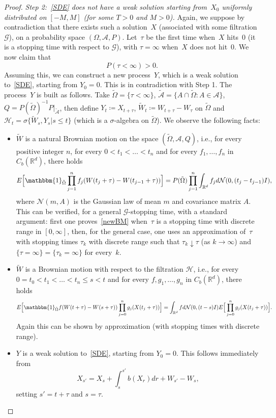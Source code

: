 \documentclass[a4paper,10pt]{article}
\newcommand\1{\mathbbm{1}}
\newcommand{\mr}{\mathbb{R}}
\newcommand{\mc}{\mathcal}
\newcommand{\td}{\tilde}
\numberwithin{equation}{section}
\begin{document}
\begin{proof}
\emph{Step 2:~\eqref{SDE} does not have a weak solution starting from~$X_0$ uniformly distributed on $[-M,M]$ \textup{(}for some $T>0$ and $M>0$\textup{)}.} Again, we suppose by contradiction that there exists such a solution~$X$ (associated with some filtration $\mc{G}$), on a probability space $(\Omega,\mc{A},P)$. Let~$\tau$ be the first time when~$X$ hits~$0$ (it is a stopping time with respect to $\mc{G}$), with $\tau=\infty$ when~$X$ does not hit~$0$. We now claim that
\begin{equation}
P(\tau<\infty)>0 .\label{claim'}
\end{equation}
Assuming this, we can construct a new process~$Y$, which is a weak solution to~\eqref{SDE}, starting from $Y_0=0$. This is in contradiction with Step 1. The process~$Y$ is built as follows. Take $\td{\Omega}=\{\tau<\infty\}$, $\td{\mc{A}}=\{A\cap\td{\Omega} \colon A\in\mc{A}\}$, $Q= P(\td{\Omega})^{-1} P|_{\td{\mc{A}}}$, then define $Y_t \coloneqq X_{t+\tau}$, $\td{W}_t \coloneqq W_{t+\tau}-W_\tau$ on $\td{\Omega}$ and $\mc{H}_t=\sigma\{\td{W}_s,Y_s|s\le t\}$ (which is a $\sigma$-algebra on $\td{\Omega}$). We observe the following facts:

\begin{itemize}
  \item $\td{W}$ is a natural Brownian motion on the space $(\td{\Omega},\mc{A},Q)$, i.e., for every positive integer $n$, for every $0<t_1<\ldots < t_n$ and for every $f_1,\ldots, f_n$ in $C_b(\mr^d)$, there holds 
  \begin{equation}
  E\Big[ \1_{\td{\Omega}}\prod^n_{j=1}f_j(W(t_j+\tau)-W(t_{j-1}+\tau))\Big]= P(\td{\Omega})\prod^n_{j=1}\int_{\mr^d}f_jd\mc{N}(0,(t_j-t_{j-1})I),\label{newBM}
  \end{equation}
  where $\mc{N}(m,A)$ is the Gaussian law of mean $m$ and covariance matrix $A$. This can be verified, for a general $\mc{G}$-stopping time, with a standard argument: first one proves~\eqref{newBM} when~$\tau$ is a stopping time with discrete range in $[0,\infty]$, then, for the general case, one uses an approximation of~$\tau$ with stopping times $\tau_k$ with discrete range such that $\tau_k\downarrow\tau$ (as $k\rightarrow\infty$) and $\{\tau=\infty\}=\{\tau_k=\infty\}$ for every~$k$.
  \item $\td{W}$ is a Brownian motion with respect to the filtration $\mc{H}$, i.e., for every $0=t_0<t_1<\ldots < t_n\le s<t$ and for every $f,g_1,\ldots, g_n$ in $C_b(\mr^d)$, there holds 
  \begin{equation*}
  E\Big[ \1_{\td{\Omega}}f(W(t+\tau)-W(s+\tau))\prod^n_{j=0}g_j(X(t_j+\tau))\Big]= \int_{\mr^d}fd\mc{N}(0,(t-s)I)E\Big[\prod^n_{j=0}g_j(X(t_j+\tau))\Big].
  \end{equation*}
  Again this can be shown by approximation (with stopping times with discrete range).
  \item $Y$ is a weak solution to~\eqref{SDE}, starting from $Y_0 = 0$. This follows immediately from
  \begin{equation*}
  X_{s'}=X_s+\int^{s'}_sb(X_r)dr+W_{s'}-W_s ,
  \end{equation*}
  setting $s'=t+\tau$ and $s=\tau$.
\end{itemize}


\end{proof}
\end{document}

